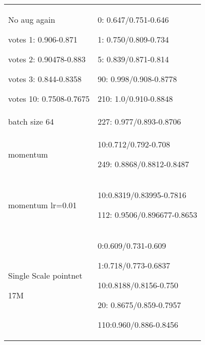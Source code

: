 \documentclass[,table,dvipsnames]{article}
\begin{document}
\begin{tabular}{|p{10cm}|p{5.5cm}| }
	\rowcolor{orange!20}
	No aug again\par
	votes 1: 0.906-0.871\par votes 2: 0.90478-0.883\par votes 3: 0.844-0.8358\par votes 10: 0.7508-0.7675
	&0: 0.647/0.751-0.646\par 1: 0.750/0.809-0.734\par 5: 0.839/0.871-0.814\par 90: 0.998/0.908-0.8778\par 210: 1.0/0.910-0.8848
	\\

	\rowcolor{green!20}
	batch size 64 & 227: 0.977/0.893-0.8706\\
	
	\rowcolor{yellow!20}
	momentum & 10:0.712/0.792-0.708\par 249: 0.8868/0.8812-0.8487\\
	
	\rowcolor{green!20}
	momentum lr=0.01 & 10:0.8319/0.83995-0.7816\par 112: 0.9506/0.896677-0.8653\\
	
	\rowcolor{orange!20}
	Single Scale pointnet \par 17M& 0:0.609/0.731-0.609\par 1:0.718/0.773-0.6837\par 10:0.8188/0.8156-0.750\par  20: 0.8675/0.859-0.7957 \par 110:0.960/0.886-0.8456\\
	
	\hline 	
\end{tabular}
\end{document}
